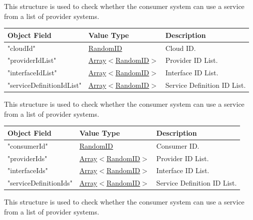 \documentclass[a4paper]{arrowhead}
\newcommand{\mref}[1]{{\textcolor{ArrowheadPurple}{\hyperref[sec:model:#1]{#1}}}}
\newcommand{\pref}[1]{{\textcolor{ArrowheadGrey}{\hyperref[sec:model:primitives:#1]{#1}}}}
\begin{document}

This structure is used to check whether the consumer system can use a service from a list of provider systems.

\begin{table}[ht!]
\begin{tabularx}{\textwidth}{| p{5cm} | p{5cm} | X |} \hline
\rowcolor{gray!33} Object Field & Value Type      & Description \\ \hline
"cloudId"                   & \pref{RandomID}     & Cloud ID. \\ \hline
"providerIdList"            & \pref{Array}$<$\mref{RandomID}$>$     & Provider ID List. \\ \hline
"interfaceIdList"           & \pref{Array}$<$\mref{RandomID}$>$     & Interface ID List. \\ \hline
"serviceDefinitionIdList"   & \pref{Array}$<$\mref{RandomID}$>$     & Service Definition ID List. \\ \hline

\end{tabularx}
\end{table}


This structure is used to check whether the consumer system can use a service from a list of provider systems.

\begin{table}[ht!]
\begin{tabularx}{\textwidth}{| p{5cm} | p{5cm} | X |} \hline
\rowcolor{gray!33} Object Field & Value Type      & Description \\ \hline
"consumerId"                & \pref{RandomID}     & Consumer ID. \\ \hline
"providerIds"            & \pref{Array}$<$\mref{RandomID}$>$     & Provider ID List. \\ \hline
"interfaceIds"           & \pref{Array}$<$\mref{RandomID}$>$     & Interface ID List. \\ \hline
"serviceDefinitionIds"   & \pref{Array}$<$\mref{RandomID}$>$     & Service Definition ID List. \\ \hline

\end{tabularx}
\end{table}



This structure is used to check whether the consumer system can use a service from a list of provider systems.
\end{document}

